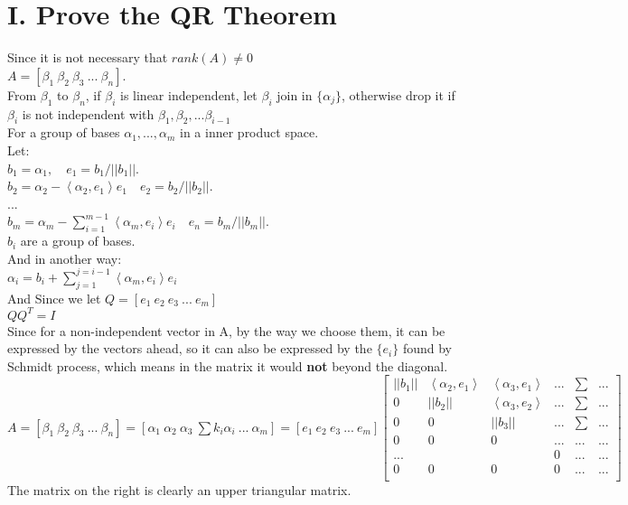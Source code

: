\documentclass[twoside,a4paper]{article}
\begin{document}
\pagestyle{fancy}
\fancyhead{}

\section*{I. Prove the QR Theorem}
Since it is not necessary that $rank(A) \neq 0$\\
$A=[\beta_1 \ \beta_2 \ \beta_3 \ ... \ \beta_n]$.\\
From $\beta_1$ to $\beta_n$, if $\beta_i$ is linear independent, let $\beta_i$ join in $\{\alpha_j\}$, otherwise drop it if $\beta_i$ is not independent with $\beta_1,\beta_2,...\beta_{i-1}$\\
For a group of bases $\alpha_1,...,\alpha_m$ in a inner product space.\\
Let:\\
$b_1=\alpha_1, \quad e_1=b_1/||b_1||$.\\
$b_2=\alpha_2-\left<\alpha_2,e_1 \right>e_1 \quad e_2=b_2/||b_2||$.\\
...\\
$b_m=\alpha_m-\sum_{i=1}^{m-1} \left<\alpha_m,e_i \right>e_i  \quad e_n=b_m/||b_m||$.\\
$b_i$ are a group of bases.\\
And in another way:\\
$\alpha_i=b_i+\sum_{j=1}^{j=i-1} \left<\alpha_m,e_i \right>e_i$\\
And Since we let $Q=[e_1 \ e_2 \ e_3 \ ... \ e_m]$ \\
$QQ^{T}=I$\\
Since for a non-independent vector in A, by the way we choose them, it can be expressed by the vectors ahead, so it can also be expressed by the $\{e_i\}$ found by Schmidt process, which means in the matrix it would \textbf{not} beyond the diagonal.\\
$A=[\beta_1 \ \beta_2 \ \beta_3 \ ... \ \beta_n]=[\alpha_1 \ \alpha_2 \ \alpha_3  \ \sum k_i\alpha_i  \ ... \ \alpha_m]=[e_1 \ e_2 \ e_3 \ ... \ e_m]
\begin{bmatrix}
||b_1|| & \left<\alpha_2,e_1 \right>&\left<\alpha_3,e_1 \right>&...&\sum&...\\
0       & ||b_2||                   & \left<\alpha_3,e_2 \right>&...&\sum&...\\
0       &  0                        &   ||b_3||                 &...&\sum&...\\
0       & 0                         &0                          &... &... &...\\
...     &                           &                           &0   &...&...\\
0       &0                          & 0                         &0   &...&...\\
\end{bmatrix}
$\\
The matrix on the right is clearly an upper triangular matrix.\\
\end{document}
